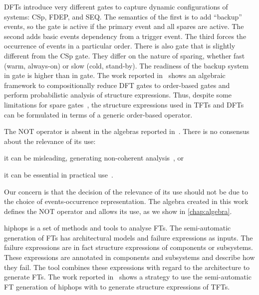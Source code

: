 \Acp{DFT} introduce very different gates to capture dynamic configurations of systems: \ac{CSp}, \ac{FDEP}, and \ac{SEQ}.
The semantics of the first is to add ``backup'' events, so the gate is active if the primary event and all spares are active.
The second adds basic events dependency from a trigger event.
The third forces the occurrence of events in a particular order.
There is also  gate that is slightly different from the \ac{CSp} gate.
They differ on the nature of sparing, whether fast (warm, always-on) or slow (cold, stand-by).
The readiness of the backup system in  gate is higher than in  gate.
The work reported in~\cite{MRL2011} shows an algebraic framework to compositionally reduce \ac{DFT} gates to order-based gates and perform probabilistic analysis of structure expressions. Thus, despite some limitations for spare gates~\cite{MRL2014}, the structure expressions used in \acp{TFT} and \acp{DFT} can be formulated in terms of a generic order-based operator.

\begin{sloppypar}
The \ac{NOT} operator is absent in the algebras reported in~\cite{WP2009,Walker2009,Merle2010,MRL2011b}.
There is no consensus about the relevance of its use:
\begin{alineasinline}
  \item it can be misleading, generating non-coherent analysis~\cite{Oliv2006}, or
  \item it can be essential in practical use~\cite{Andrews2001}.
\end{alineasinline}
Our concern is that the decision of the relevance of its use should not be due to the choice of events-occurrence representation.
The algebra created in this work defines the \ac{NOT} operator and allows its use, as we show in \cref{chap:algebra}.
\end{sloppypar}

\begin{sloppypar}
\Ac{hiphops} is a set of methods and tools to analyse \acp{FT}.
The semi-automatic generation of \acp{FT} has architectural models and failure expressions as inputs.
The failure expressions are in fact structure expressions of components or subsystems.
These expressions are annotated in components and subsystems and describe how they fail.
The tool combines these expressions with regard to the architecture to generate \acp{FT}.
The work reported in~\cite{WP2008} shows a strategy to use the semi-automatic \ac{FT} generation of \ac{hiphops} with \pandora to generate structure expressions of \acp{TFT}.
\end{sloppypar}

